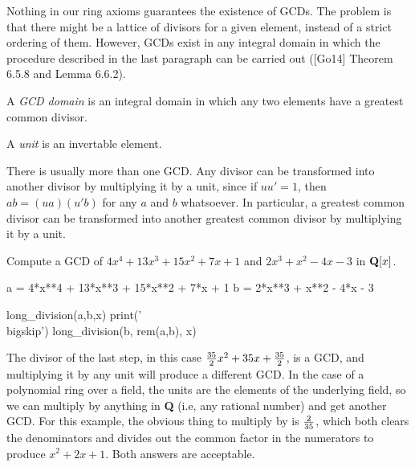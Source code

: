 Nothing in our ring axioms guarantees the existence of GCDs.  The
problem is that there might be a lattice of divisors for a given
element, instead of a strict ordering of them.  However, GCDs exist in
any integral domain in which the procedure described in the last
paragraph can be carried out ([Go14] Theorem 6.5.8 and Lemma 6.6.2).

\begin{key point}
A {\it GCD domain} is an integral domain in which
any two elements have a greatest common divisor.
\end{key point}

\begin{key point}
A {\it unit} is an invertable element.
\end{key point}

There is usually more than one GCD.  Any divisor can be transformed into
another divisor by multiplying it by a unit, since if $uu'=1$, then
$ab=(ua)(u'b)$ for any $a$ and $b$ whatsoever.  In particular, a
greatest common divisor can be transformed into another greatest
common divisor by multiplying it by a unit.

\begin{comment}
I leave without proof the
claims that in ${\cal F}[x]$, the units are all elements in ${\cal
F}$, and that all GCDs differ from each other by a unit multiple.
\end{comment}

\vfill\eject

\example

Compute a GCD of $4x^4+13x^3+15x^2+7x+1$ and $2x^3+x^2-4x-3$ in ${\bf Q}[x]$.

\bigskip

\begin{sympycode}
a = 4*x**4 + 13*x**3 + 15*x**2 + 7*x + 1
b = 2*x**3 + x**2 - 4*x - 3

long_division(a,b,x)
print('\\bigskip')
long_division(b, rem(a,b), x)
\end{sympycode}

\bigskip

The divisor of the last step, in this case
${35\over2}x^2+35x+{35\over2}$, is a GCD, and multiplying it by any unit
will produce a different GCD.  In the case of a polynomial ring over a
field, the units are the elements of the underlying field, so we can
multiply by anything in {\bf Q} (i.e, any rational number) and get
another GCD.  For this example, the obvious thing to multiply by is
$2\over35$, which both clears the denominators and divides out the
common factor in the numerators to produce $x^2+2x+1$.  Both answers
are acceptable.

